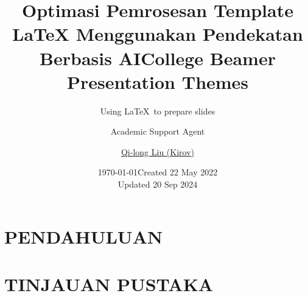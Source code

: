 \documentclass{beamer}
\title{Optimasi Pemrosesan Template LaTeX Menggunakan Pendekatan Berbasis AI}
\author{Academic Support Agent}
\date{\today}
\begin{document}
\maketitle

\begin{abstract}

\end{abstract}

\chapter{PENDAHULUAN}


\chapter{TINJAUAN PUSTAKA}


\usepackage[polyu,en]{collegeBeamer}


\title{College Beamer\\ Presentation Themes}
\subtitle{Using \LaTeX\ to prepare slides}
\author{\href{mailto:qilong-kirov.liu@connect.polyu.hk}{Qi-long Liu (Kirov)}}
\date{Created 22 May 2022\\Updated 20 Sep 2024}
\end{document}

